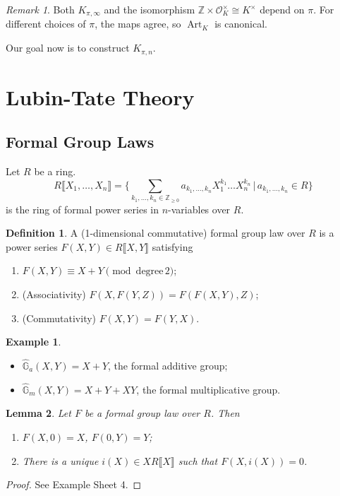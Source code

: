 \documentclass[11pt]{article}
\theoremstyle{definition}
\newtheorem{definition}{Definition}[subsection]
\newtheorem*{example}{Example}
\theoremstyle{plain}
\newtheorem{lemma}[definition]{Lemma}
\theoremstyle{remark}
\newtheorem*{remark}{Remark}
\DeclareMathOperator{\Art}{Art}
\newcommand{\ZZ}{\mathbb{Z}}
\newcommand{\cO}{\mathcal{O}}
\newcommand{\Ghat}{\widehat{\mathbb{G}}}
\begin{document}
\begin{remark}
    Both $K_{\pi, \infty}$ and the isomorphism $\ZZ \times \cO_K^\times \cong K^\times$ depend on $\pi$. For different choices of $\pi$, the maps agree, so $\Art_K$ is canonical.
\end{remark}

Our goal now is to construct $K_{\pi,n}$.

\section{Lubin-Tate Theory}

\subsection{Formal Group Laws}

Let $R$ be a ring.
\begin{equation*}
    R\llbracket X_1, \ldots, X_n \rrbracket = \bigg\{\sum_{k_1, \ldots, k_n \in \ZZ_{\ge 0}} a_{k_1, \ldots, k_n} X_1^{k_1} \ldots X_n^{k_n} \,\bigg\vert\, a_{k_1, \ldots, k_n} \in R\bigg\}
\end{equation*}
is the ring of formal power series in $n$-variables over $R$.

\begin{definition}\label{def:18_1}
    A (1-dimensional commutative) formal group law over $R$ is a power series $F(X, Y) \in R\llbracket X, Y \rrbracket$ satisfying
    \begin{enumerate}
        \item $F(X, Y) \equiv X + Y \pmod{\textrm{degree}\,2}$;
        \item (Associativity) $F(X, F(Y, Z)) = F(F(X, Y), Z)$;
        \item (Commutativity) $F(X, Y) = F(Y, X)$.
    \end{enumerate}
\end{definition}

\begin{example}\phantom{}
    \begin{itemize}
        \item $\Ghat_a(X, Y) = X + Y$, the formal additive group;
        \item $\Ghat_m(X, Y) = X + Y + XY$, the formal multiplicative group.
    \end{itemize}
\end{example}

\begin{lemma}\label{lem:18_2}
    Let $F$ be a formal group law over $R$. Then
    \begin{enumerate}
        \item $F(X, 0) = X$, $F(0, Y) = Y$;
        \item There is a unique $i(X) \in X R\llbracket X \rrbracket$ such that $F(X, i(X)) = 0$.
    \end{enumerate}
\end{lemma}
\begin{proof}
    See Example Sheet 4.
\end{proof}
\end{document}
